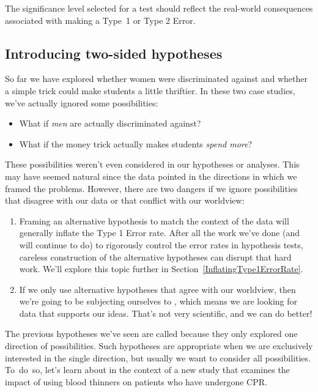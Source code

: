 \begin{tipBox}{
The significance level selected for a test should reflect the real-world consequences associated with making a Type~1 or Type 2 Error.}
\end{tipBox}


\subsection{Introducing two-sided hypotheses}
\label{IntroducingTwoSidedHypotheses}


So far we have explored whether women were discriminated against and whether a simple trick could make students a little thriftier. In these two case studies, we've actually ignored some possibilities:
\begin{itemize}
\item What if \emph{men} are actually discriminated against?
\item What if the money trick actually makes students \emph{spend more}?
\end{itemize}
These possibilities weren't even considered in our hypotheses or analyses. This may have seemed natural since the data pointed in the directions in which we framed the problems. However, there are two dangers if we ignore possibilities that disagree with our data or that conflict with our worldview:
\begin{enumerate}
\item Framing an alternative hypothesis to match the context of the data will generally inflate the Type 1 Error rate. After all the work we've done (and will continue to do) to rigorously control the error rates in hypothesis tests, careless construction of the alternative hypotheses can disrupt that hard work. We'll explore this topic further in Section~\ref{InflatingType1ErrorRate}.
\item If we only use alternative hypotheses that agree with our worldview, then we're going to be subjecting ourselves to , which means we are looking for data that supports our ideas. That's not very scientific, and we can do better!
\end{enumerate}
The previous hypotheses we've seen are called  because they only explored one direction of possibilities. Such hypotheses are appropriate when we are exclusively interested in the single direction, but usually we want to consider all possibilities. To~do~so, let's learn about  in the context of a new study that examines the impact of using blood thinners on patients who have undergone CPR.

